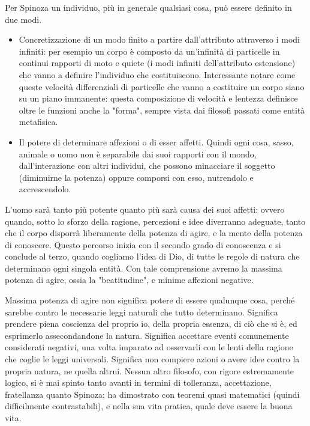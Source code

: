 Per Spinoza un individuo, più in generale qualsiasi cosa, può essere definito in due modi.
\begin{itemize}
	\item Concretizzazione di un modo finito a partire dall'attributo  attraverso i modi infiniti: per esempio un corpo è composto da un'infinità di particelle in continui rapporti di moto e quiete (i modi infiniti dell'attributo estensione) che vanno a definire l'individuo che costituiscono. Interessante notare come queste velocità differenziali di particelle che vanno a costituire un corpo siano su un piano immanente: questa composizione di velocità e lentezza definisce oltre le funzioni anche la "forma", sempre vista dai filosofi passati come entità metafisica.
	\item Il potere di determinare affezioni o di esser affetti. Quindi ogni cosa, sasso, animale o uomo non è separabile dai suoi rapporti con il mondo, dall'interazione con altri individui, che possono minacciare il soggetto (diminuirne la potenza) oppure comporsi con esso, nutrendolo e accrescendolo.
\end{itemize}

L'uomo sarà tanto più potente quanto più sarà causa dei suoi affetti: ovvero quando, sotto lo sforzo della ragione, percezioni e idee diverranno adeguate, tanto che il corpo disporrà liberamente della potenza di agire, e la mente della potenza di conoscere. Questo percorso inizia con il secondo grado di conoscenza e si conclude al terzo, quando cogliamo l'idea di Dio, di tutte le regole di natura che determinano ogni singola entità. Con tale comprensione avremo la massima potenza di agire, ossia la "beatitudine", e minime affezioni negative. 

Massima potenza di agire non significa potere di essere qualunque cosa, perché sarebbe contro le necessarie leggi naturali che tutto determinano. Significa prendere piena coscienza del proprio io, della propria essenza, di ciò che si è, ed esprimerlo assecondandone la natura. Significa accettare eventi comunemente considerati negativi, una volta imparato ad osservarli con le lenti della ragione che coglie le leggi universali. Significa non compiere azioni o avere idee contro la propria natura, ne quella altrui. Nessun altro filosofo, con rigore estremamente logico, si è mai spinto tanto avanti in termini di tolleranza, accettazione, fratellanza quanto Spinoza; ha dimostrato con teoremi quasi matematici (quindi difficilmente contrastabili), e nella sua vita pratica,  quale deve essere la buona vita.


